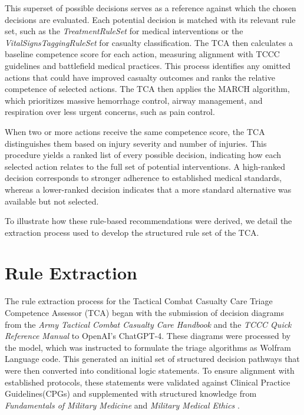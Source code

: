 \documentclass[conference]{IEEEtran}
\begin{document}
This superset of possible decisions serves as a reference against which the chosen decisions are evaluated. Each potential decision is matched with its relevant rule set, such as the \textit{TreatmentRuleSet} for medical interventions or the \textit{VitalSignsTaggingRuleSet} for casualty classification. The TCA then calculates a baseline competence score for each action, measuring alignment with TCCC guidelines and battlefield medical practices. This process identifies any omitted actions that could have improved casualty outcomes and ranks the relative competence of selected actions. The TCA then applies the MARCH algorithm, which prioritizes massive hemorrhage control, airway management, and respiration over less urgent concerns, such as pain control.

When two or more actions receive the same competence score, the TCA distinguishes them based on injury severity and number of injuries. This procedure yields a ranked list of every possible decision, indicating how each selected action relates to the full set of potential interventions. A high-ranked decision corresponds to stronger adherence to established medical standards, whereas a lower-ranked decision indicates that a more standard alternative was available but not selected.

To illustrate how these rule-based recommendations were derived, we detail the extraction process used to develop the structured rule set of the TCA.

\section{Rule Extraction}
\label{sec:rule_extraction}
The rule extraction process for the Tactical Combat Casualty Care Triage Competence Assessor (TCA) began with the submission of decision diagrams from the \textit{Army Tactical Combat Casualty Care Handbook} \cite{army2017tccc} and the \textit{TCCC Quick Reference Manual} \cite{cotccc2021tccc} to OpenAI’s ChatGPT-4. These diagrams were processed by the model, which was instructed to formulate the triage algorithms as Wolfram Language code. This generated an initial set of structured decision pathways that were then converted into conditional logic statements. To ensure alignment with established protocols, these statements were validated against Clinical Practice Guidelines(CPGs) \cite{jts2025cpgs} and supplemented with structured knowledge from \textit{Fundamentals of Military Medicine} \cite{oconnor2019fundamentals} and \textit{Military Medical Ethics} \cite{beam2003military}.
\end{document}
